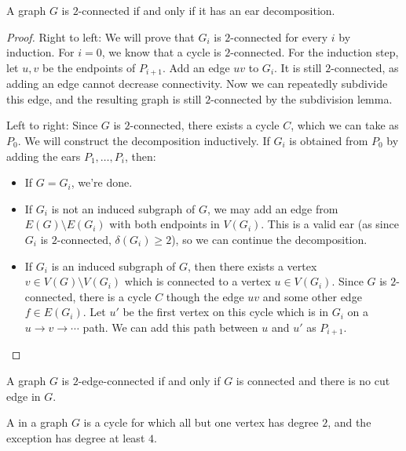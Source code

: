 \begin{theorem}
  A graph $G$ is $2$-connected if and only if it has an ear decomposition.
\end{theorem}

\begin{proof}
  Right to left:
  We will prove that $G_i$ is $2$-connected for every $i$ by induction.
  For $i=0$, we know that a cycle is $2$-connected.
  For the induction step, let $u,v$ be the endpoints of $P_{i+1}$.
  Add an edge $uv$ to $G_i$.
  It is still $2$-connected, as adding an edge cannot decrease connectivity.
  Now we can repeatedly subdivide this edge, and the resulting graph is still
  $2$-connected by the subdivision lemma.

  Left to right:
  Since $G$ is $2$-connected, there exists a cycle $C$, which we can take as
  $P_0$.
  We will construct the decomposition inductively.
  If $G_i$ is obtained from $P_0$ by adding the ears $P_1, \ldots, P_i$, then:
  \begin{itemize}
  \item If $G = G_i$, we're done.
  \item If $G_i$ is not an induced subgraph of $G$, we may add an edge from
	$E(G) \setminus E(G_i)$ with both endpoints in $V(G_i)$.
	This is a valid ear (as since $G_i$ is $2$-connected, $\delta(G_i) \ge 2$),
	so we can continue the decomposition.
  \item If $G_i$ is an induced subgraph of $G$, then there exists a vertex $v
	\in V(G) \setminus V(G_i)$ which is connected to a vertex $u \in V(G_i)$.
	Since $G$ is $2$-connected, there is a cycle $C$ though the edge $uv$ and
	some other edge $f \in E(G_i)$.
	Let $u'$ be the first vertex on this cycle which is in $G_i$ on a $u \to v
	\to \cdots$ path.
	We can add this path between $u$ and $u'$ as $P_{i+1}$.
	\qedhere
  \end{itemize}
\end{proof}


\begin{proposition}
  A graph $G$ is $2$-edge-connected if and only if $G$ is connected and there is
  no cut edge in $G$.
\end{proposition}

\begin{definition}
  A  in a graph $G$ is a cycle for which all but one vertex
  has degree $2$, and the exception has degree at least $4$.
\end{definition}

